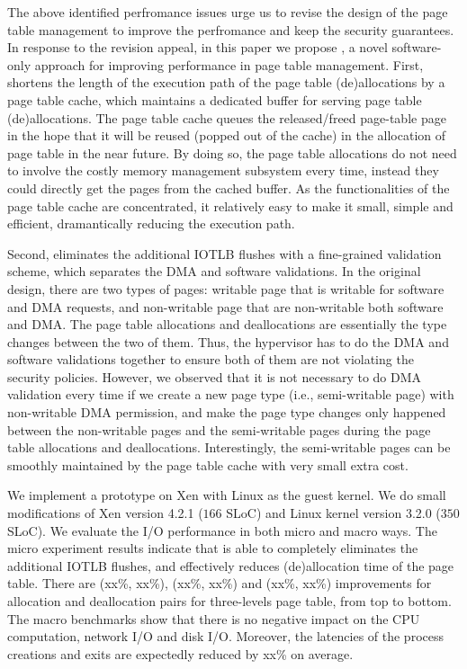 The above identified perfromance issues urge us to revise the design of the page table management to improve the perfromance and keep the security guarantees. 
In response to the revision appeal, in this paper we propose \name, a novel software-only approach for improving performance in page table management. 
First, \name shortens the length of the execution path of the page table (de)allocations by a page table cache, which maintains a dedicated buffer for serving page table (de)allocations.
The page table cache queues the released/freed page-table page in the hope that 
it will be reused (popped out of the cache) in the allocation of page table in the near future.
By doing so, the page table allocations do not need to involve the costly memory management subsystem every time, instead they could directly get the pages from the cached buffer.
As the functionalities of the page table cache are concentrated, it relatively easy to make it small, simple and efficient, dramantically reducing the execution path.

Second, \name eliminates the additional IOTLB flushes with a fine-grained validation scheme, which separates the DMA and software validations.
In the original design, there are two types of pages: writable page that is writable for software and DMA requests, and non-writable page that are non-writable both software and DMA.
The page table allocations and deallocations are essentially the type changes between the two of them.
Thus, the hypervisor has to do the DMA and software validations together to ensure both of them are not violating the security policies.
However, we observed that it is not necessary to do DMA validation every time if we create a new page type (i.e., semi-writable page) with non-writable DMA permission, and make the page type changes only happened between the non-writable pages and the semi-writable pages during the page table allocations and deallocations. 
Interestingly, the semi-writable pages can be smoothly maintained by the page table cache with very small extra cost.

We implement a prototype on Xen with Linux as the guest kernel. We do small modifications of Xen version 4.2.1 ($166$ SLoC) and Linux kernel version 3.2.0 ($350$ SLoC).
We evaluate the I/O performance in both micro and macro ways.
The micro experiment results indicate that \name is able to completely eliminates the additional IOTLB flushes, and effectively reduces (de)allocation time of the page table. 
There are (xx\%, xx\%), (xx\%, xx\%) and (xx\%, xx\%) improvements for allocation and deallocation pairs for three-levels page table, from top to bottom.
The macro benchmarks show that there is no negative impact on the CPU computation, network I/O and disk I/O. 
Moreover, the latencies of the process creations and exits are expectedly reduced by xx\% on average. 


